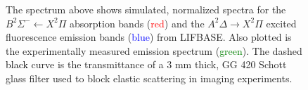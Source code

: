 \begin{figure}

\centering



\caption[CH PLIF Spectrum]{The spectrum above shows simulated, normalized spectra for the \(B^2\Sigma^-\leftarrow X^2\Pi\) absorption bands (\textcolor{red}{red}) and the \(A^2\Delta\rightarrow X^2\Pi\) excited fluorescence emission bands (\textcolor{blue}{blue}) from LIFBASE. Also plotted is the experimentally measured emission spectrum (\textcolor{green}{green}). The dashed \textcolor{black}{black} curve is the transmittance of a 3 mm thick, GG 420 Schott glass filter used to block elastic scattering in imaging experiments.}

\label{fig:chPLIFSpectrum}

\end{figure}

